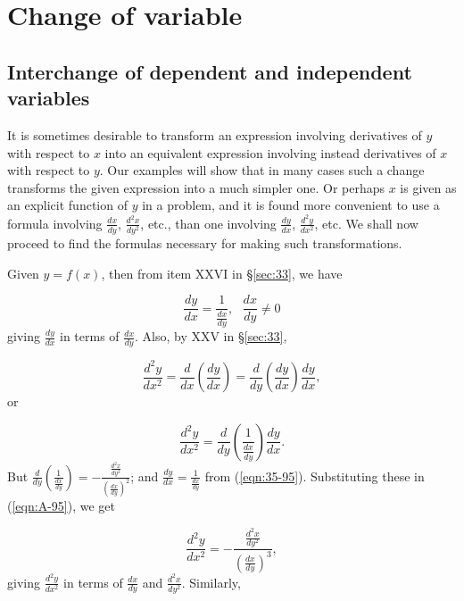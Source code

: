 
\chapter{Change of variable}


\section{Interchange of dependent and independent variables}

It is sometimes desirable to transform an expression involving 
derivatives of $y$ with respect to $x$ into an equivalent 
expression involving instead derivatives of $x$ with respect to $y$. 
Our examples will show that in many cases such a change 
transforms the given expression into a much simpler one. 
Or perhaps $x$ is given as an explicit function of $y$ in a 
problem, and it is found more
convenient to use a formula involving $\frac{dx}{dy}$, 
$\frac{d^2 x}{dy^2}$, etc., than one involving $\frac{dy}{dx}$, 
$\frac{d^2 y}{dx^2}$, etc. We shall now proceed to find the 
formulas necessary for making such transformations.

Given $y = f(x)$, then from item XXVI in \S \ref{sec:33}, 
we have

\begin{equation}
\frac{dy}{dx} = \frac{1}{\frac{dx}{dy}}, \ \ \ 	\frac{dx}{dy} \ne 0
\label{eqn:35-95}
\end{equation}
giving $\frac{dy}{dx}$ in terms of $\frac{dx}{dy}$. Also, 
by XXV in \S \ref{sec:33},

\[
\frac{d^2 y}{dx^2} 	
= \frac{d}{dx} \left( \frac{dy}{dx} \right) 
= \frac{d}{dy} \left( \frac{dy}{dx} \right) \frac{dy}{dx},
\]
or

\begin{equation}
\frac{d^2 y}{dx^2} 	
= \frac{d}{dy} \left( \frac{1}{\frac{dx}{dy}} \right) \frac{dy}{dx}.
\label{eqn:A-95}
\end{equation}
But 	
$\frac{d}{dy} \left( \frac{1}{\frac{dx}{dy}} \right) 	
= - \frac{\frac{d^2 x}{dy^2}}{\left( \frac{dx}{dy} \right)^2}$; 
and $\frac{dy}{dx} = \frac{1}{\frac{dx}{dy}}$ from 
(\ref{eqn:35-95}).
Substituting these in (\ref{eqn:A-95}), we get

\begin{equation}
\frac{d^2 y}{dx^2} 
= -\frac{ \frac{d^2 x}{dy^2} }{\left( \frac{dx}{dy} \right)^3}, 	 
\label{eqn:36-95}
\end{equation}
giving $\frac{d^2 y}{dx^2}$ in terms of 
$\frac{dx}{dy}$ and $\frac{d^2 x}{dy^2}$. Similarly,

